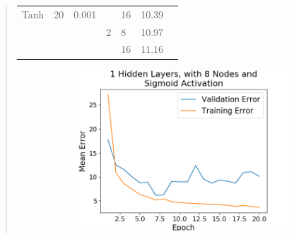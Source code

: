 \documentclass{article}
\begin{document}
\begin{quote}
\begin{table}[h!]
\begin{tabular}{|c|c|c|c|l|c|c|}
			Tanh                                                             & 20                    & 0.001                                                      &                                                         & 16                                                                             & 10.39                                                &                                                         \\ \cline{4-6}
			&                       &                                                            & 2                                                       & 8                                                                              & 10.97                                                &                                                         \\ \cline{5-6}
			\multicolumn{1}{|l|}{}                                           & \multicolumn{1}{l|}{} & \multicolumn{1}{l|}{}                                      & \multicolumn{1}{l|}{}                                   & 16                                                                             & 11.16                                                &                                                         \\ \hline
		\end{tabular}
	\end{table}
	\setlength{\parindent}{10ex}
	 \begin{figure}[h]
		\centering
		\begin{subfigure}[h]{0.23\textwidth}
			\includegraphics[width=\textwidth]{figs/Boston_Housing_Regression_1_Hidden_Layers_with_8_Nodes_and_Sigmoid_Activation.png}

\end{subfigure}
\end{figure}
\end{quote}
\end{document}
